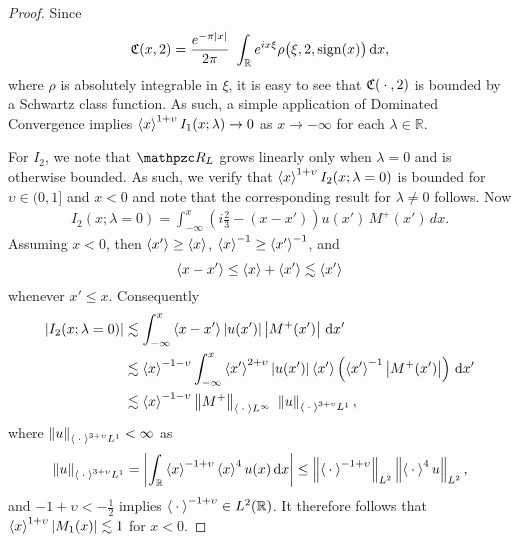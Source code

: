 \documentclass[../dissertation.tex]{subfiles}
\begin{document}
\begin{proof}
	Since 
	\[
		\mathfrak C(x, 2)
			= \frac{e^{-\pi|x|}}{2\pi}	\
				\int_{\mathbb R} e^{ix\xi} \rho\big(\xi, 2, \operatorname{sign}(x)\big) \, \mathrm{d}x,
	\]
	where $\rho$ is absolutely integrable in $\xi$, it is easy to see that 
	$\mathfrak C(\kern 0.5ex \cdot \kern 0.5ex, 2)$ is bounded by a Schwartz class function. As such, 
	a simple application of Dominated Convergence implies 
	$\left\langle x \right\rangle^{1+\upsilon} I_1(x; \lambda) \to 0$ as $x\to -\infty$ for each 
	$\lambda \in \mathbb R$. 

	For $I_2$, we note that $\mathpzc R_L$ grows linearly only when $\lambda=0$
	and is otherwise bounded. As such, we verify that 
	$\left\langle x \right\rangle^{1+\upsilon} I_2(x; \lambda =0)$ is bounded for $\upsilon \in (0,1]$
	and $x < 0$ and note that the corresponding result for $\lambda \ne 0$ follows.
	Now
	\begin{align*}
		I_2(x; \lambda=0) 
			= 
				\int_{-\infty}^x 
					\left(i\frac{2}{3} - (x - x')\right) u(x')\,M^+(x')
				\,dx.
	\end{align*}
	Assuming $x < 0$, then $\left\langle x' \right\rangle \geq \left\langle x \right\rangle$, $\left\langle x \right\rangle^{-1} \geq \left\langle x' \right\rangle^{-1}$, and
	\[
		\left\langle x-x' \right\rangle \leq \left\langle x \right\rangle + \left\langle x' \right\rangle \lesssim \left\langle x' \right\rangle
	\]
	whenever $x' \leq x$.
	Consequently
	\begin{align*}
		|I_2(x; \lambda = 0)|
			&\lesssim \int_{-\infty}^x \left\langle x - x' \right\rangle |u(x')| \left|M^+(x')\right| \, \mathrm{d}x' 
				\\
			&\lesssim 
				\left\langle x \right\rangle^{-1-\upsilon} 
				\int_{-\infty}^x 
					\left\langle x' \right\rangle^{2+\upsilon} |u(x')| \left\langle x' \right\rangle 
					\left(\left\langle x' \right\rangle^{-1} \left|M^+(x')\right| \right)
				\, \mathrm{d}x'
				\\
			&\lesssim 
				\left\langle x \right\rangle^{-1-\upsilon} 
				\left\| M^+ \right\|_{\left\langle \kern 0.5ex \cdot \kern 0.5ex \right\rangle L^\infty} \
				\left\| u \right\|_{\left\langle \kern 0.5ex \cdot \kern 0.5ex \right\rangle^{3+\upsilon}L^1},
	\end{align*}
	where $\left\| u \right\|_{\left\langle \kern 0.5ex \cdot \kern 0.5ex \right\rangle^{3+\upsilon}L^1}<\infty$ as 
	\begin{align*}
		\left\| u \right\|_{\left\langle \kern 0.5ex \cdot \kern 0.5ex \right\rangle^{3+\upsilon}L^1}
			= 
				\left| 
					\int_{\mathbb R} 
						\left\langle x \right\rangle^{-1+\upsilon}\left\langle x \right\rangle^{4} u(x) 
					\, \mathrm{d}x
				\right|
			\leq 
				\left\| \left\langle \kern 0.5ex \cdot \kern 0.5ex \right\rangle^{-1+\upsilon} \right\|_{L^2} 
				\left\| \left\langle \kern 0.5ex \cdot \kern 0.5ex \right\rangle^{4} u \right\|_{L^2},
	\end{align*}
	and $-1+\upsilon < -\frac{1}{2}$ implies 
	$\left\langle \kern 0.5ex \cdot \kern 0.5ex \right\rangle^{-1+\upsilon} \in L^2(\mathbb R)$. It therefore follows that 
	$\left\langle x \right\rangle^{1+\upsilon} |M_1(x)| \lesssim 1$ for $x < 0$. 
\end{proof}
\end{document}
